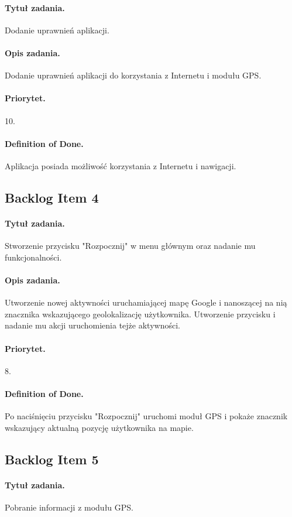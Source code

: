 \documentclass[a4paper]{article}
\begin{document}
\paragraph{Tytuł zadania.} Dodanie uprawnień aplikacji.
\paragraph{Opis zadania.} Dodanie uprawnień aplikacji do korzystania z Internetu i modułu GPS.
\paragraph{Priorytet.} 10.
\paragraph{Definition of Done.} Aplikacja posiada możliwość korzystania z Internetu i nawigacji.

\subsection{Backlog Item 4}
\paragraph{Tytuł zadania.} Stworzenie przycisku "Rozpocznij" w menu głównym oraz nadanie mu funkcjonalności.
\paragraph{Opis zadania.} Utworzenie nowej aktywności uruchamiającej mapę Google i nanoszącej na nią znacznika wskazującego geolokalizację użytkownika. Utworzenie przycisku i nadanie mu akcji uruchomienia tejże aktywności.
\paragraph{Priorytet.} 8.
\paragraph{Definition of Done.} Po naciśnięciu przycisku "Rozpocznij" uruchomi moduł GPS i pokaże znacznik wskazujący aktualną pozycję użytkownika na mapie.

\subsection{Backlog Item 5}
\paragraph{Tytuł zadania.} Pobranie informacji z modułu GPS.
\end{document}
